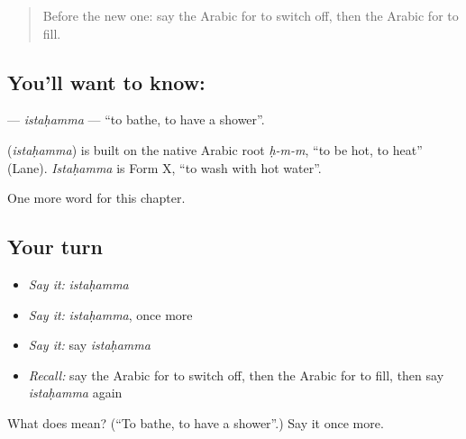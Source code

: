 \label{lesson:AR-C160-istahamma}



\begin{quote}
Before the new one: say the Arabic for to switch off, then the Arabic for to fill.
\end{quote}

\subsection*{You'll want to know: }
\textbf{} — \emph{istaḥamma} — \textquotedblleft{}to bathe, to have a shower\textquotedblright{}.

\begin{cousinweb}
\textbf{} (\emph{istaḥamma}) is built on the native Arabic root \emph{ḥ-m-m}, \textquotedblleft{}to be hot, to heat\textquotedblright{} (Lane). \emph{Istaḥamma} is Form X, \textquotedblleft{}to wash with hot water\textquotedblright{}.
\end{cousinweb}

\begin{grammarlens}[title={What you've built}]
One more word for this chapter.
\end{grammarlens}

\subsection*{Your turn}
\begin{itemize}
\raggedright
  \item \emph{Say it:} \emph{istaḥamma}
  \item \emph{Say it:} \emph{istaḥamma}, once more
  \item \emph{Say it:} say \emph{istaḥamma}
  \item \emph{Recall:} say the Arabic for to switch off, then the Arabic for to fill, then say \emph{istaḥamma} again
\end{itemize}

\begin{tcolorbox}[breakable,colback=teal!4,colframe=teal!35!black,title={Before you move on}]
What does  mean? (\textquotedblleft{}To bathe, to have a shower\textquotedblright{}.) Say it once more.
\end{tcolorbox}
